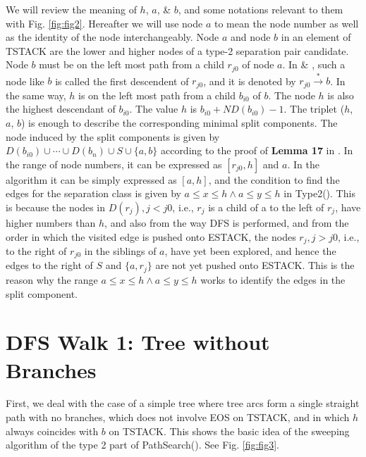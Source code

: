 \documentclass[twoside,twocolumn]{article}
\begin{document}
We will review the meaning of $h$, $a$, \& $b$, and some notations relevant to
them with Fig. \ref{fig:fig2}.  Hereafter we will use node $a$ to mean the node number as
 well as the identity of the node interchangeably.
Node $a$ and node $b$ in an element of {\ttfamily TSTACK} are the lower and higher nodes of a
type-2 separation pair candidate.
Node $b$ must be on the left most path from a child $r_{j0}$ of
node $a$. In \cite{HT73} \& \cite{GM01}, such a node like $b$ is called the first descendent of
$r_{j0}$,  and it is denoted by $r_{j0}\xrightarrow* b$. In the same way, $h$ is on the left most
path from
 a child $b_{i0}$ of $b$. The node $h$ is also the highest descendant of $b_{i0}$.
The value $h$ is $b_{i0} + ND(b_{i0}) - 1$.
The triplet ($h$, $a$, $b$) is enough to describe the corresponding minimal
split components.  The node induced by the split components is given by
$D(b_{i0}) \cup\cdots\cup D(b_n) \cup S \cup \{a,b\}$ according to the proof of
{\bf Lemma 17} in \cite{HT73}. In the range of node numbers, it can be expressed as
$[r_{j0}, h]$ and $a$.
In the algorithm it can be simply expressed as $[a,h]$, and the condition
 to find the edges for the separation class is given by $a \leq x \leq h \wedge a \leq y \leq h$ in
{\ttfamily Type2()}. This is because the nodes in $D(r_j), j < j0$, i.e., $r_j$
is a child of a to the left of $r_j$, have higher numbers than $h$, and also
from the way DFS is performed, and from the order in which the visited edge
is pushed onto {\ttfamily ESTACK}, the nodes $r_j, j > j0$, i.e., to the right of $r_{j0}$
in the siblings of $a$, have yet been explored, and hence the edges to the right
 of $S$ and $\{a ,r_j\}$ are not yet pushed onto {\ttfamily ESTACK}. This is the reason why the
range $a \leq x \leq h \wedge a \leq y \leq h$ works to identify the edges in the split component.

\section{DFS Walk 1: Tree without Branches}

First, we deal with the case of a simple tree where tree arcs form a single
straight path with no branches, which does not involve {\ttfamily EOS} on {\ttfamily TSTACK},
and in which $h$ always coincides with $b$ on {\ttfamily TSTACK}.
This shows the basic idea of the sweeping algorithm of the type 2 part of {\ttfamily PathSearch()}.
See Fig. \ref{fig:fig3}.
\end{document}

